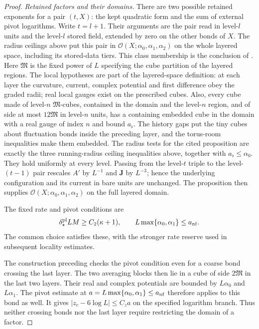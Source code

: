 \documentclass[11pt,letterpaper,reqno]{amsart}
\theoremstyle{definition}
\theoremstyle{remark}
\begin{document}
\begin{proof}
\emph{Retained factors and their domains.}
There are two possible retained exponents for a pair $(t,X)$:
the kept quadratic form and the sum of external pivot
logarithms. Write $t=l+1$. Their arguments are the pair
read in level-$l$ units and the level-$l$ stored field,
extended by zero on the other bonds of $X$.
The radius ceilings above put this pair in
$\mathscr O(X;\alpha_0,\alpha_1,\alpha_2)$ on the whole
layered space, including its stored-data tiers.
This class membership is the conclusion of
\cite[Prop.~4.97]{YMM1}. Here $\mathfrak M$ is the fixed
power of $L$ specifying the cube partition of the layered
regions. The local hypotheses are part of the layered-space
definition: at each layer the
curvature, current, complex potential and first
difference obey the graded radii; real local gauges
exist on the prescribed cubes. Also, every cube made of
level-$n$ $\mathfrak M$-cubes, contained in the domain and
the level-$n$ region, and of side at most $12\mathfrak M$
in level-$n$ units, has a containing embedded cube in the
domain with a real gauge of index $n$ and bound $a_\flat$.
The history gaps put the tiny cubes about fluctuation
bonds inside the preceding layer, and the torus-room
inequalities make them embedded. The radius tests
for the cited proposition are exactly the three
running-radius ceiling inequalities above, together
with $a_\flat\le\alpha_0$. They hold uniformly at
every level. Passing from the level-$t$ triple to
the level-$(t-1)$ pair rescales $A'$ by $L^{-1}$
and $\mathbf J$ by $L^{-3}$; hence the underlying
configuration and its current in bare units are
unchanged. The proposition then supplies
$\mathscr O(X;\alpha_0,\alpha_1,\alpha_2)$ on the
full layered domain.

The fixed rate and pivot conditions are
\[
 \delta_\star^{\rm pl}LM\ge C_2(\kappa+1),\qquad
 L\max\{\alpha_0,\alpha_1\}\le a_{\rm nf}.
\]
The common choice satisfies these, with the stronger rate
reserve used in subsequent locality estimates.

The construction preceding \cite[Prop.~4.144]{YMM1} checks the pivot
condition even for a coarse bond crossing the last layer.
The two averaging blocks then lie in a cube of side
$2\mathfrak M$ in the last two layers. Their real and
complex potentials are bounded by $L\alpha_0$ and
$L\alpha_1$. The pivot estimate at
$a=L\max\{\alpha_0,\alpha_1\}\le a_{\rm nf}$ therefore
applies to this bond as well. It gives
$|z_c-6\log L|\le C_za$ on the specified logarithm branch.
Thus neither crossing bonds nor the last layer require
restricting the domain of a factor.


\end{proof}
\end{document}
